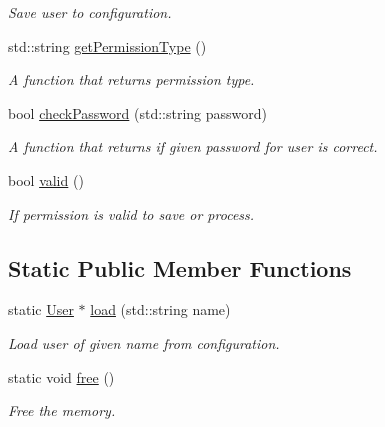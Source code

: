 \begin{DoxyCompactItemize}
\begin{DoxyCompactList}\small\item\em Save user to configuration. \end{DoxyCompactList}\item 
std\+::string \hyperlink{class_r_c_f_1_1_server_1_1_user_acb9ca59d39d60acb9429d248aac5e0a3}{get\+Permission\+Type} ()
\begin{DoxyCompactList}\small\item\em A function that returns permission type. \end{DoxyCompactList}\item 
bool \hyperlink{class_r_c_f_1_1_server_1_1_user_a8800a92ececa3ce0921e5af963e6e792}{check\+Password} (std\+::string password)
\begin{DoxyCompactList}\small\item\em A function that returns if given password for user is correct. \end{DoxyCompactList}\item 
bool \hyperlink{class_r_c_f_1_1_server_1_1_user_ae9dd4687b66e16cd3bd7635580574834}{valid} ()
\begin{DoxyCompactList}\small\item\em If permission is valid to save or process. \end{DoxyCompactList}\end{DoxyCompactItemize}
\subsection*{Static Public Member Functions}
\begin{DoxyCompactItemize}
\item 
static \hyperlink{class_r_c_f_1_1_server_1_1_user}{User} $\ast$ \hyperlink{class_r_c_f_1_1_server_1_1_user_a6c737b62c8eb966bc82c87461ce8f6d2}{load} (std\+::string name)
\begin{DoxyCompactList}\small\item\em Load user of given name from configuration. \end{DoxyCompactList}\item 
\hypertarget{class_r_c_f_1_1_server_1_1_user_ad00a8df2a935feb2504073f9146c9fe1}{}static void \hyperlink{class_r_c_f_1_1_server_1_1_user_ad00a8df2a935feb2504073f9146c9fe1}{free} ()\label{class_r_c_f_1_1_server_1_1_user_ad00a8df2a935feb2504073f9146c9fe1}

\begin{DoxyCompactList}\small\item\em Free the memory. \end{DoxyCompactList}\end{DoxyCompactItemize}
